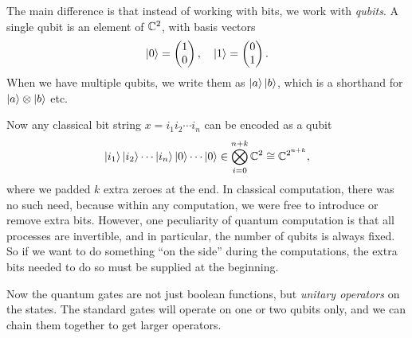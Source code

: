 The main difference is that instead of working with bits, we work with \emph{qubits}. A single qubit is an element of $\mathbb{C}^2$, with basis vectors
\[
  \left\lvert 0\right\rangle =
  \begin{pmatrix}
    1 \\ 0
  \end{pmatrix},\quad
  \left\lvert 1\right\rangle =
  \begin{pmatrix}
    0 \\ 1
  \end{pmatrix}.
\]
When we have multiple qubits, we write them as $\left\lvert a\right\rangle\left\lvert b\right\rangle$, which is a shorthand for $\left\lvert a\right\rangle \otimes \left\lvert b\right\rangle$ etc.

Now any classical bit string $x = i_1 i_2 \cdots i_n$ can be encoded as a qubit
\[
  \left\lvert i_1\right\rangle \left\lvert i_2\right\rangle\cdots\left\lvert i_n\right\rangle\left\lvert 0\right\rangle\cdots\left\lvert 0\right\rangle \in \bigotimes_{i = 0}^{n + k} \mathbb{C}^2 \cong \mathbb{C}^{2^{n + k}},
\]
where we padded $k$ extra zeroes at the end. In classical computation, there was no such need, because within any computation, we were free to introduce or remove extra bits. However, one peculiarity of quantum computation is that all processes are invertible, and in particular, the number of qubits is always fixed. So if we want to do something ``on the side'' during the computations, the extra bits needed to do so must be supplied at the beginning.

Now the quantum gates are not just boolean functions, but \emph{unitary operators} on the states. The standard gates will operate on one or two qubits only, and we can chain them together to get larger operators.

